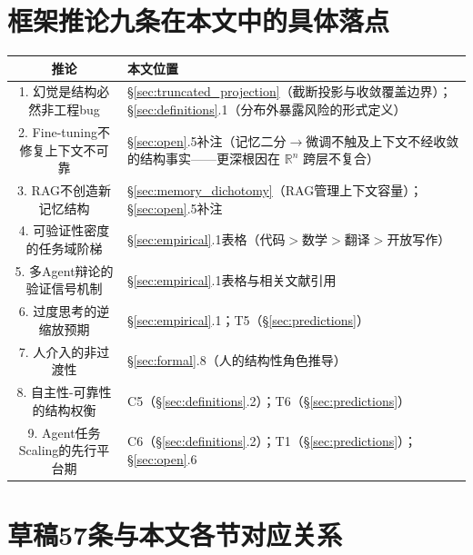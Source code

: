 \documentclass[11pt,a4paper]{article}
\theoremstyle{definition}
\begin{document}
\section{框架推论九条在本文中的具体落点}

\begin{table}[H]
\centering
\begin{tabular}{@{}c@{}p{8.5cm}@{}}
\toprule
\textbf{推论} & \textbf{本文位置} \\
\midrule
1. 幻觉是结构必然非工程bug & \S\ref{sec:truncated_projection}（截断投影与收敛覆盖边界）；\S\ref{sec:definitions}.1（分布外暴露风险的形式定义） \\
2. Fine-tuning不修复上下文不可靠 & \S\ref{sec:open}.5补注（记忆二分$\to$微调不触及上下文不经收敛的结构事实——更深根因在 $\mathbb{R}^n$ 跨层不复合） \\
3. RAG不创造新记忆结构 & \S\ref{sec:memory_dichotomy}（RAG管理上下文容量）；\S\ref{sec:open}.5补注 \\
4. 可验证性密度的任务域阶梯 & \S\ref{sec:empirical}.1表格（代码$>$数学$>$翻译$>$开放写作） \\
5. 多Agent辩论的验证信号机制 & \S\ref{sec:empirical}.1表格与相关文献引用 \\
6. 过度思考的逆缩放预期 & \S\ref{sec:empirical}.1；T5（\S\ref{sec:predictions}） \\
7. 人介入的非过渡性 & \S\ref{sec:formal}.8（人的结构性角色推导） \\
8. 自主性-可靠性的结构权衡 & C5（\S\ref{sec:definitions}.2）；T6（\S\ref{sec:predictions}） \\
9. Agent任务Scaling的先行平台期 & C6（\S\ref{sec:definitions}.2）；T1（\S\ref{sec:predictions}）；\S\ref{sec:open}.6 \\
\bottomrule
\end{tabular}
\end{table}

\section{草稿57条与本文各节对应关系}
\end{document}
